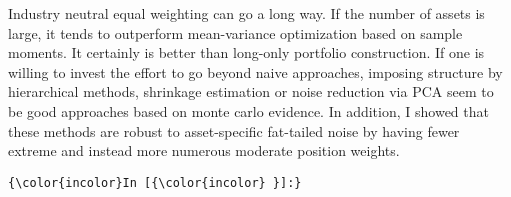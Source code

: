 \documentclass[11pt]{article}
\begin{document}
Industry neutral equal weighting can go a long way. If the number of
assets is large, it tends to outperform mean-variance optimization based
on sample moments. It certainly is better than long-only portfolio
construction. If one is willing to invest the effort to go beyond naive
approaches, imposing structure by hierarchical methods, shrinkage
estimation or noise reduction via PCA seem to be good approaches based
on monte carlo evidence. In addition, I showed that these methods are
robust to asset-specific fat-tailed noise by having fewer extreme and
instead more numerous moderate position weights.

   \begin{Verbatim}[commandchars=\\\{\},fontsize=\scriptsize]
{\color{incolor}In [{\color{incolor} }]:} 
\end{Verbatim}


    
    
    
    
\end{document}
